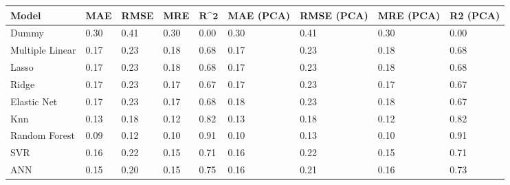 \begin{table}
\centering
\label{table:iri_reg_pred}
\begin{tabular}{lllllllll}
\toprule
 \textbf{Model} & \textbf{MAE} & \textbf{RMSE} & \textbf{MRE} & $\textbf{R^2}$ & \textbf{MAE (PCA)} & \textbf{RMSE (PCA)} & \textbf{MRE (PCA)} & \textbf{R2 (PCA)} \\
\midrule
          Dummy &         0.30 &          0.41 &         0.30 &           0.00 &               0.30 &                0.41 &               0.30 &              0.00 \\
Multiple Linear &         0.17 &          0.23 &         0.18 &           0.68 &               0.17 &                0.23 &               0.18 &              0.68 \\
          Lasso &         0.17 &          0.23 &         0.18 &           0.68 &               0.17 &                0.23 &               0.18 &              0.68 \\
          Ridge &         0.17 &          0.23 &         0.17 &           0.67 &               0.17 &                0.23 &               0.17 &              0.67 \\
    Elastic Net &         0.17 &          0.23 &         0.17 &           0.68 &               0.18 &                0.23 &               0.18 &              0.67 \\
            Knn &         0.13 &          0.18 &         0.12 &           0.82 &               0.13 &                0.18 &               0.12 &              0.82 \\
  Random Forest &         0.09 &          0.12 &         0.10 &           0.91 &               0.10 &                0.13 &               0.10 &              0.91 \\
            SVR &         0.16 &          0.22 &         0.15 &           0.71 &               0.16 &                0.22 &               0.15 &              0.71 \\
            ANN &         0.15 &          0.20 &         0.15 &           0.75 &               0.16 &                0.21 &               0.16 &              0.73 \\
\bottomrule
\end{tabular}
\end{table}
